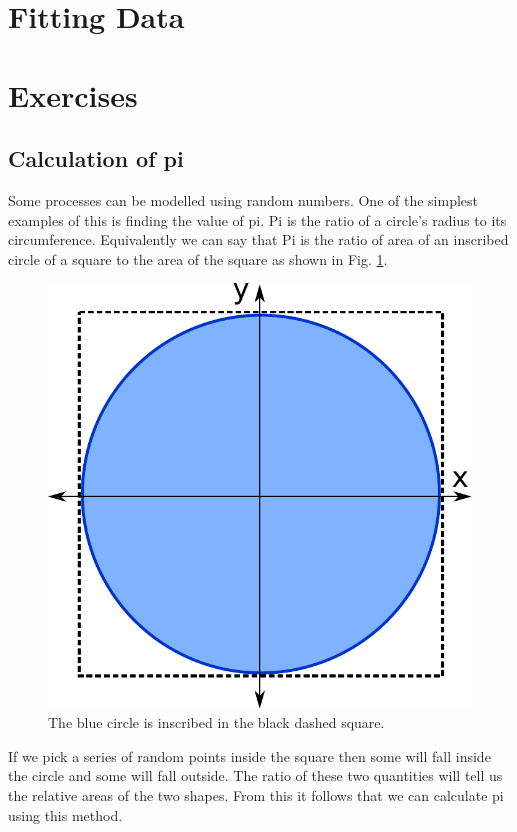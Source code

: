\section{Fitting Data}


\section{Exercises}
	\subsection{Calculation of pi}
		Some processes can be modelled using random numbers. One of the simplest examples of this is finding the value of pi. Pi is the ratio of a circle's radius to its circumference. Equivalently we can say that Pi is the ratio of area of an inscribed circle of a square to the area of the square as shown in Fig. \ref{fig:picircle}. 
	\begin{figure}[h]
		\centering
		\includegraphics[scale=0.4]{images/pi}
		\caption{The blue circle is inscribed in the black dashed square.}
		\label{fig:picircle}
	\end{figure}

	If we pick a series of random points inside the square then some will fall inside the circle and some will fall outside. The ratio of these two quantities will tell us the relative areas of the two shapes. From this it follows that we can calculate pi using this method.

